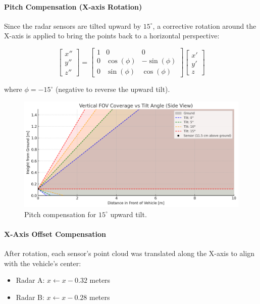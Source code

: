 \vspace{2em}

\paragraph{Pitch Compensation (X-axis Rotation)}
Since the radar sensors are tilted upward by $15^\circ$, a corrective rotation around the X-axis is applied to bring the points back to a horizontal perspective: 

\[
\begin{bmatrix}
x'' \\ y'' \\ z''
\end{bmatrix}
=
\begin{bmatrix}
1 & 0 & 0 \\
0 & \cos(\phi) & -\sin(\phi) \\
0 & \sin(\phi) & \cos(\phi)
\end{bmatrix}
\begin{bmatrix}
x' \\ y' \\ z
\end{bmatrix}
\]

where $\phi = -15^\circ$ (negative to reverse the upward tilt).

\begin{figure}[!htbp]
    \centering
    \includegraphics[width=0.8\linewidth]{images/TiltSensor.png}
    \caption{Pitch compensation for $15^\circ$ upward tilt.}
    \label{fig:x_axis_rotation}
\end{figure}

\vspace{2em}

\paragraph{X-Axis Offset Compensation}
After rotation, each sensor's point cloud was translated along the X-axis to align with the vehicle's center:
\begin{itemize}
    \item Radar A: $x \leftarrow x - 0.32$ meters
    \item Radar B: $x \leftarrow x - 0.28$ meters
\end{itemize}

